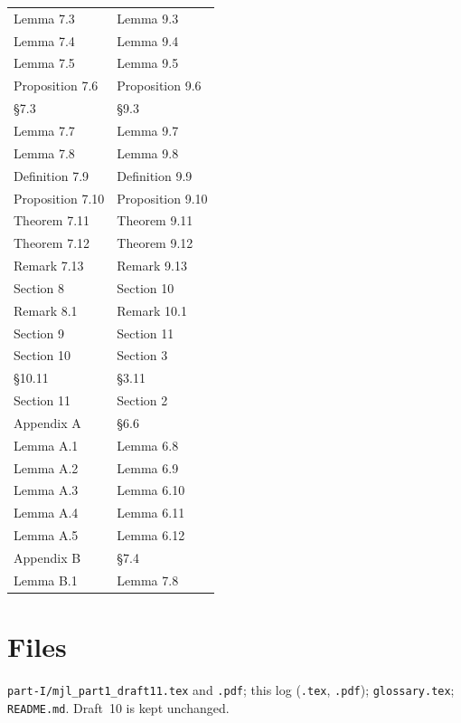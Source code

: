 \documentclass[11pt]{article}
\begin{document}
\begin{center}
\begin{tabular}[t]{@{}ll@{}}
Lemma 7.3 & Lemma 9.3\\
Lemma 7.4 & Lemma 9.4\\
Lemma 7.5 & Lemma 9.5\\
Proposition 7.6 & Proposition 9.6\\
\S7.3 & \S9.3\\
Lemma 7.7 & Lemma 9.7\\
Lemma 7.8 & Lemma 9.8\\
Definition 7.9 & Definition 9.9\\
Proposition 7.10 & Proposition 9.10\\
Theorem 7.11 & Theorem 9.11\\
Theorem 7.12 & Theorem 9.12\\
Remark 7.13 & Remark 9.13\\
Section 8 & Section 10\\
Remark 8.1 & Remark 10.1\\
Section 9 & Section 11\\
Section 10 & Section 3\\
\S10.11 & \S3.11\\
Section 11 & Section 2\\
Appendix A & \S6.6\\
Lemma A.1 & Lemma 6.8\\
Lemma A.2 & Lemma 6.9\\
Lemma A.3 & Lemma 6.10\\
Lemma A.4 & Lemma 6.11\\
Lemma A.5 & Lemma 6.12\\
Appendix B & \S7.4\\
Lemma B.1 & Lemma 7.8\\
\bottomrule\end{tabular}\hfill
\end{center}

\section*{Files}
\texttt{part-I/mjl\_part1\_draft11.tex} and \texttt{.pdf}; this log
(\texttt{.tex}, \texttt{.pdf}); \texttt{glossary.tex}; \texttt{README.md}.
Draft~10 is kept unchanged.
\end{document}
